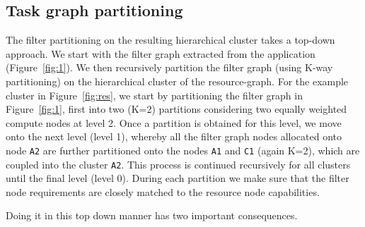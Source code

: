 

\subsection{Task graph partitioning}
\label{sec:filter-graph-part}

The filter partitioning on the resulting hierarchical cluster takes a
top-down approach. We start with the filter graph extracted from the
application (Figure~\ref{fig:1}). We then recursively partition the filter
graph (using K-way partitioning) on the hierarchical cluster of the
resource-graph. For the example cluster in Figure~\ref{fig:res}, we
start by partitioning the filter graph in Figure~\ref{fig:1}, first into
two (K=2) partitions considering two equally weighted compute nodes at
level 2. Once a partition is obtained for this level, we move onto the
next level (level 1), whereby all the filter graph nodes allocated onto
node \texttt{A2} are further partitioned onto the nodes \texttt{A1} and
\texttt{C1} (again K=2), which are coupled into the cluster
\texttt{A2}. This process is continued recursively for all clusters until the
final level (level 0). During each partition we make
sure that the filter node requirements are closely matched to the resource
node capabilities.


Doing it in this top down manner has two important consequences.

